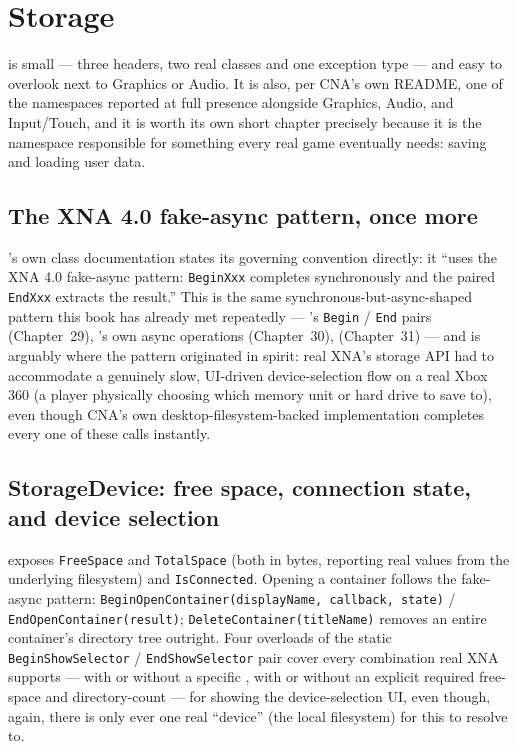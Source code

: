 \chapter{Storage}
\label{ch:storage}

 is small --- three headers, two real classes and
one exception type --- and easy to overlook next to Graphics or Audio. It is also, per CNA's
own README, one of the namespaces reported at full presence alongside Graphics, Audio, and
Input/Touch, and it is worth its own short chapter precisely because it is the namespace
responsible for something every real game eventually needs: saving and loading user data.

\section{The XNA 4.0 fake-async pattern, once more}

's own class documentation states its governing convention directly:
it ``uses the XNA 4.0 fake-async pattern: \texttt{BeginXxx} completes synchronously and the
paired \texttt{EndXxx} extracts the result.'' This is the same synchronous-but-async-shaped
pattern this book has already met repeatedly --- 's
\texttt{Begin} / \texttt{End} pairs (Chapter~29), 's own async
operations (Chapter~30),  (Chapter~31) --- and
 is arguably where the pattern originated in spirit: real XNA's
storage API had to accommodate a genuinely slow, UI-driven device-selection flow on a real
Xbox 360 (a player physically choosing which memory unit or hard drive to save to), even
though CNA's own desktop-filesystem-backed implementation completes every one of these calls
instantly.

\section{StorageDevice: free space, connection state, and device selection}

 exposes \texttt{FreeSpace} and \texttt{TotalSpace} (both in bytes,
reporting real values from the underlying filesystem) and \texttt{IsConnected}. Opening a
container follows the fake-async pattern:
\texttt{BeginOpenContainer(displayName, callback, state)} / \texttt{EndOpenContainer(result)};
\texttt{DeleteContainer(titleName)} removes an entire container's directory tree outright.
Four overloads of the static \texttt{BeginShowSelector} / \texttt{EndShowSelector} pair cover
every combination real XNA supports --- with or without a specific ,
with or without an explicit required free-space and directory-count --- for showing the
device-selection UI, even though, again, there is only ever one real ``device'' (the local
filesystem) for this to resolve to.

